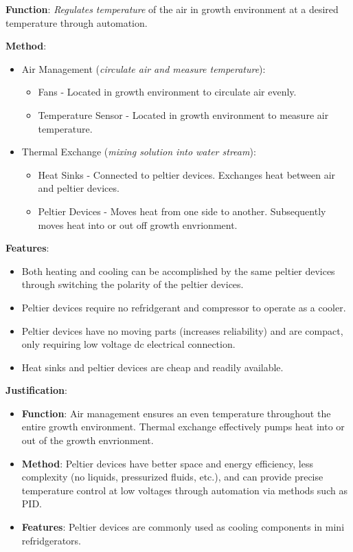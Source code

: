 \documentclass{report}
\begin{document}
\textbf{Function}: \textit{Regulates temperature} of the air in growth environment at a desired temperature through automation.

\textbf{Method}:
\begin{itemize}
    \item Air Management (\textit{circulate air and measure temperature}):
    \begin{itemize}
        \item Fans - Located in growth environment to circulate air evenly.
        \item Temperature Sensor - Located in growth environment to measure air temperature.
    \end{itemize}
    \item Thermal Exchange (\textit{mixing solution into water stream}):
    \begin{itemize}
        \item Heat Sinks - Connected to peltier devices. Exchanges heat between air and peltier devices.
        \item Peltier Devices - Moves heat from one side to another. Subsequently moves heat into or out off growth envrionment.
    \end{itemize}
\end{itemize}

\textbf{Features}:
\begin{itemize}
    \item Both heating and cooling can be accomplished by the same peltier devices through switching the polarity of the peltier devices.
    \item Peltier devices require no refridgerant and compressor to operate as a cooler.
    \item Peltier devices have no moving parts (increases reliability) and are compact, only requiring low voltage dc electrical connection.
    \item Heat sinks and peltier devices are cheap and readily available.
\end{itemize}

\textbf{Justification}: 
\begin{itemize}
    \item \textbf{Function}: Air management ensures an even temperature throughout the entire growth environment. Thermal exchange effectively pumps heat into or out of the growth envrionment.
    \item \textbf{Method}:  Peltier devices have better space and energy efficiency, less complexity (no liquids, pressurized fluids, etc.), and can provide precise temperature control at low voltages through automation via methods such as PID.
    \item \textbf{Features}: Peltier devices are commonly used as cooling components in mini refridgerators.
\end{itemize}
\end{document}
